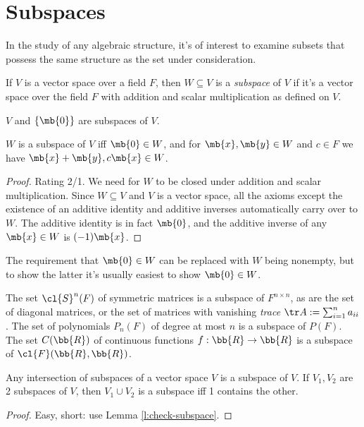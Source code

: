 \section{Subspaces}
In the study of any algebraic structure, it's of interest to examine subsets that possess the same structure as the set under consideration.
\begin{defn}
If $V$ is a vector space over a field $F$, then $W \subseteq V$ is a \emph{subspace} of $V$ if it's a vector space over the field $F$ with addition and scalar multiplication as defined on $V$.
\end{defn}
$V$ and $\{ \mb{0}\}$ are subspaces of $V$.
\begin{lem}\label{l:check-subspace}
$W$ is a subspace of $V$ iff $\mb{0}\in W$, and for $\mb{x}, \mb{y}\in W$ and $c \in F$ we have $\mb{x}+ \mb{y},c \mb{x}\in W$.
\end{lem}
\begin{proof}
Rating 2/1.
We need for $W$ to be closed under addition and scalar multiplication. Since $W \subseteq V$ and $V$ is a vector space, all the axioms except the existence of an additive identity and additive inverses automatically carry over to $W$. The additive identity is in fact $\mb{0}$, and the additive inverse of any $\mb{x}\in W$ is $(-1) \mb{x}$.
\end{proof}
The requirement that $\mb{0}\in W$ can be replaced with $W$ being nonempty, but to show the latter it's usually easiest to show $\mb{0}\in W$.
\begin{example}
The set $\cl{S}^n(F)$ of symmetric matrices is a subspace of $F^{n \times n}$, as are the set of diagonal matrices, or the set of matrices with vanishing \emph{trace} $\tr A:= \sum_{i=1}^na_{ii}$. The set of polynomials $P_n(F)$ of degree at most $n$ is a subspace of $P(F)$. The set $C( \bb{R})$ of continuous functions $f: \bb{R}\to \bb{R}$ is a subspace of $\cl{F}( \bb{R}, \bb{R})$.
\end{example}
\begin{lem}
Any intersection of subspaces of a vector space $V$ is a subspace of $V$. If $V_1,V_2$ are 2 subspaces of $V$, then $V_1 \cup V_2$ is a subspace iff 1 contains the other.
\end{lem}
\begin{proof}
Easy, short: use Lemma \ref{l:check-subspace}.
\end{proof}

